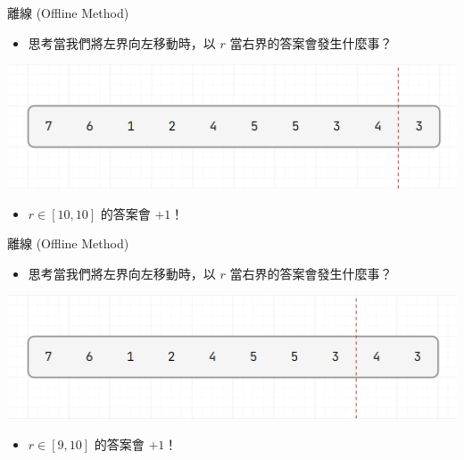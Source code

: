 \documentclass[aspectratio=169]{beamer}
\begin{document}
    \begin{frame}{離線 (Offline Method)}
        \begin{itemize}
            \item 思考當我們將左界向左移動時，以 $r$ 當右界的答案會發生什麼事？
        \end{itemize}
        \begin{center}
            \includegraphics[scale=0.4]{offline/array2.png}
        \end{center}
        \begin{itemize}
            \item $r \in [10,10]$ 的答案會 $+1$！
        \end{itemize}
    \end{frame}

    \begin{frame}{離線 (Offline Method)}
        \begin{itemize}
            \item 思考當我們將左界向左移動時，以 $r$ 當右界的答案會發生什麼事？
        \end{itemize}
        \begin{center}
            \includegraphics[scale=0.4]{offline/array3.png}
        \end{center}
        \begin{itemize}
            \item $r \in [9,10]$ 的答案會 $+1$！
        \end{itemize}
    \end{frame}
\end{document}
